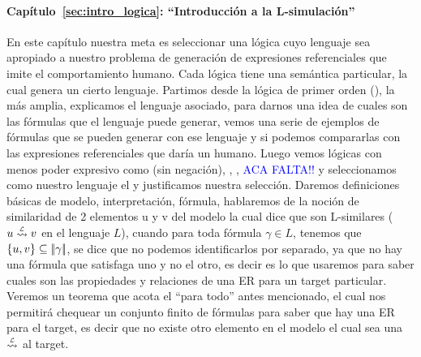 \paragraph{Cap\'itulo~\ref{sec:intro_logica}: ``Introducci\'on a la L-simulaci\'on''} En este cap\'itulo nuestra meta es seleccionar una l\'ogica cuyo lenguaje sea apropiado a nuestro problema de generaci\'on de expresiones referenciales que imite el comportamiento humano. Cada l\'ogica tiene una sem\'antica particular, la cual genera un cierto lenguaje. Partimos desde la l\'ogica de primer orden (\FOL), la m\'as amplia, explicamos el lenguaje asociado, para darnos una idea de cuales son las f\'ormulas que el lenguaje puede generar, vemos una serie de ejemplos de f\'ormulas que se pueden generar con ese lenguaje y si podemos compararlas con las expresiones referenciales que dar\'ia un humano. Luego vemos l\'ogicas con menos poder expresivo como \EPFOL (\FOL sin negaci\'on), \ALC, \EL, \ELAN \textcolor{blue}{ACA FALTA!!} y seleccionamos como nuestro lenguaje el \EL y justificamos nuestra selecci\'on. Daremos definiciones b\'asicas de modelo, interpretaci\'on, f\'ormula, hablaremos de la noci\'on de similaridad de 2 elementos u y v del modelo la cual dice que son L-similares ($u \simil{\+L} v$ en el lenguaje $L$), cuando para toda f\'ormula $\gamma \in L$, tenemos que $\{u,v\} \subseteq |\!|\gamma|\!|$, se dice que no podemos identificarlos por separado, ya que no hay una f\'ormula que satisfaga uno y no el otro, es decir es lo que usaremos para saber cuales son las propiedades y relaciones de una ER para un target particular. Veremos un teorema que acota el ``para todo'' antes mencionado, el cual nos permitir\'a chequear un conjunto finito de f\'ormulas para saber que hay una ER para el target, es decir que no existe otro elemento en el modelo el cual sea una $\simil{\+L}$ al target. 
%


